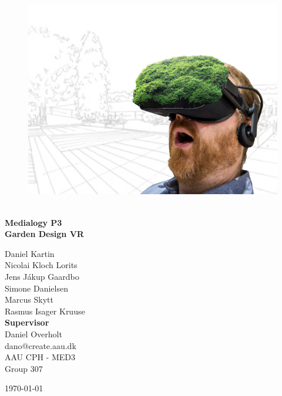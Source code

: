 \begin{titlepage}
			
\addtolength{\voffset}{2cm}

\begin{figure}[H]
\centering
\vspace{2cm}	%
\includegraphics[width=0.99\linewidth]{figure/Frontpage/gardenposterCropped.png}
\end{figure}

\mbox{}
\vfill
\renewcommand{\familydefault}{\sfdefault} \normalfont %
\HRule\\[0.2cm]
\textbf{{\small Medialogy P3\\ \Huge Garden Design VR}}\\
\HRule\medskip{}
\begin{multicols}{2}
{\Large Daniel Kartin\vspace{0.3mm}\\Nicolai Kloch Lorits\\Jens Jákup Gaardbo\\Simone Danielsen\\Marcus Skytt\\Rasmus Isager Kruuse\columnbreak}\\
\setlength{\parskip}{2.4cm}
\Large{\textbf{Supervisor}\\Daniel Overholt\\dano@create.aau.dk}
\\\small AAU CPH - 
MED3 \\
Group 307\\
\end{multicols}
\today
\renewcommand{\familydefault}{\rmdefault} \normalfont %
\end{titlepage}


